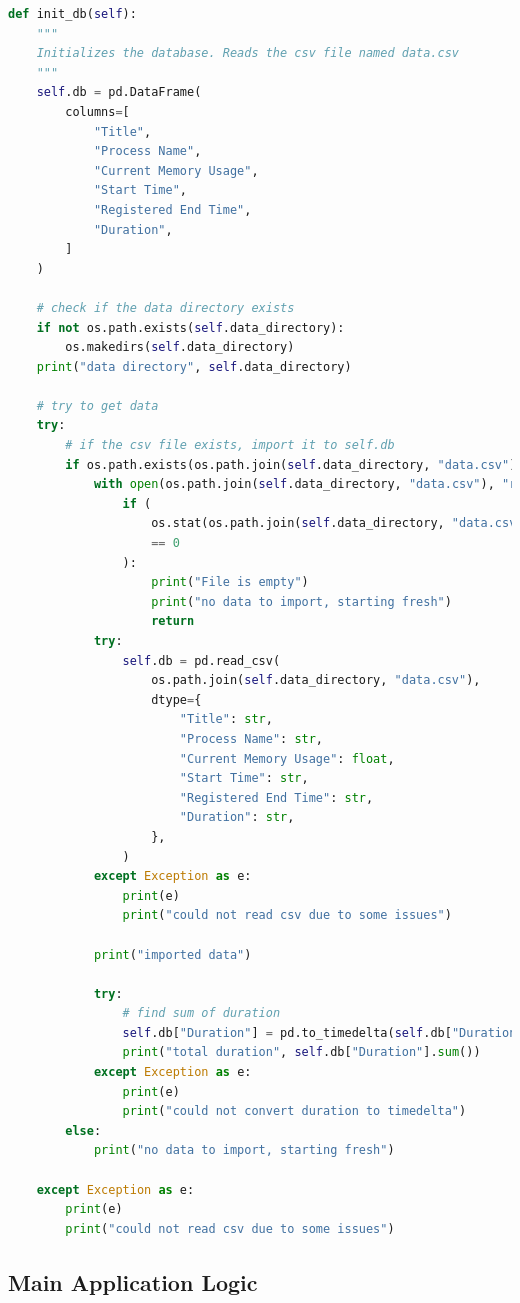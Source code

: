 \documentclass[openany]{report}
\begin{document}
\begin{lstlisting}[language=Python, caption=Database Initialization]
def init_db(self):
    """
    Initializes the database. Reads the csv file named data.csv
    """
    self.db = pd.DataFrame(
        columns=[
            "Title",
            "Process Name",
            "Current Memory Usage",
            "Start Time",
            "Registered End Time",
            "Duration",
        ]
    )

    # check if the data directory exists
    if not os.path.exists(self.data_directory):
        os.makedirs(self.data_directory)
    print("data directory", self.data_directory)

    # try to get data
    try:
        # if the csv file exists, import it to self.db
        if os.path.exists(os.path.join(self.data_directory, "data.csv")):
            with open(os.path.join(self.data_directory, "data.csv"), "r") as f:
                if (
                    os.stat(os.path.join(self.data_directory, "data.csv")).st_size
                    == 0
                ):
                    print("File is empty")
                    print("no data to import, starting fresh")
                    return
            try:
                self.db = pd.read_csv(
                    os.path.join(self.data_directory, "data.csv"),
                    dtype={
                        "Title": str,
                        "Process Name": str,
                        "Current Memory Usage": float,
                        "Start Time": str,
                        "Registered End Time": str,
                        "Duration": str,
                    },
                )
            except Exception as e:
                print(e)
                print("could not read csv due to some issues")

            print("imported data")

            try:
                # find sum of duration
                self.db["Duration"] = pd.to_timedelta(self.db["Duration"])
                print("total duration", self.db["Duration"].sum())
            except Exception as e:
                print(e)
                print("could not convert duration to timedelta")
        else:
            print("no data to import, starting fresh")

    except Exception as e:
        print(e)
        print("could not read csv due to some issues")

\end{lstlisting}

\subsection{Main Application Logic}
\end{document}
